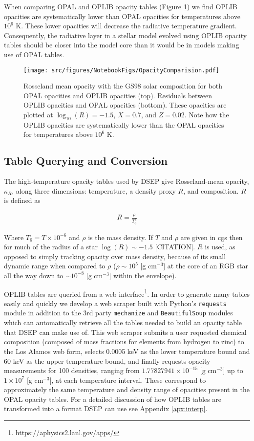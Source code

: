 When comparing OPAL and OPLIB opacity tables (Figure \ref{fig:opacComp}) we
find OPLIB opacities are systematically lower than OPAL opacities for
temperatures above $10^{6}$ K. These lower opacities will decrease the radiative
temperature gradient. Consequently, the radiative layer in a stellar model
evolved using OPLIB opacity tables should be closer into the model core than it
would be in models making use of OPAL tables.

\begin{figure}
	\centering
	\texttt{[image: src/figures/NotebookFigs/OpacityComparision.pdf]}
	\caption{Rosseland mean opacity with the GS98 solar composition for both
	OPAL opacities and OPLIB opacities (top). Residuals between OPLIB opacities
	and OPAL opacities (bottom). These opacities are plotted at $\log _{10}(R)
	= -1.5$, $X=0.7$, and $Z=0.02$. Note how the OPLIB opacities are
	systematically lower than the OPAL opacities for temperatures above $10^6$
	K.}
	\label{fig:opacComp}
\end{figure}

\subsection{Table Querying and Conversion}
The high-temperature opacity tables used by DSEP give Rosseland-mean opacity,
$\kappa_{R}$, along three dimensions: temperature, a density proxy $R$, and
composition. $R$ is defined as

\begin{align} \label{eqn:Req}
	R = \frac{\rho}{T_{6}^{3}}
\end{align}

Where $T_{6} = T\times10^{-6}$ and $\rho$ is the mass density. If $T$ and
$\rho$ are given in cgs then for much of the radius of a star $\log(R)\sim-1.5$
{\color{red}[CITATION]}.  $R$ is used, as opposed to simply tracking opacity
over mass density, because of its small dynamic range when compared to $\rho$ ($\rho\sim
10^{5}$ [g cm$^{-3}$] at the core of an RGB star all the way down to $\sim
10^{-8}$ [g cm$^{-3}$] within the envelope). 

OPLIB tables are queried from a web
interface\footnote{https://aphysics2.lanl.gov/apps/}. In order to generate many
tables easily and quickly we develop a web scraper built with Python's
\texttt{requests} module in addition to the 3rd party \texttt{mechanize} and
\texttt{BeautifulSoup} modules \citep{chandra2015python,
richardson2007beautiful} which can automatically retrieve all the tables needed
to build an opacity table that DSEP can make use of. This web scraper submits a user
requested chemical composition (composed of mass fractions for elements from
hydrogen to zinc) to the Los Alamos web form, selects 0.0005 keV as the lower
temperature bound and 60 keV as the upper temperature bound, and finally
requests opacity measurements for 100 densities, ranging from $1.77827941\times
10 ^{-15}$ [g cm$^{-3}$] up to $1\times10^{7}$ [g cm$^{-3}$], at each
temperature interval. These correspond to approximately the same temperature
and density range of opacities present in the OPAL opacity tables. For a
detailed discussion of how OPLIB tables are transformed into a format DSEP can
use see Appendix \ref{apx:interp}.

